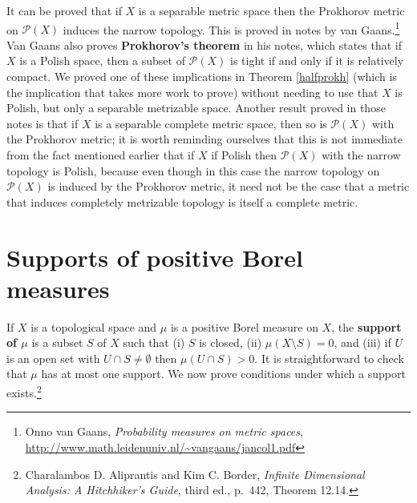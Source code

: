 \documentclass{article}
\theoremstyle{definition}
\begin{document}
It can be proved that if $X$ is a separable metric space then the Prokhorov metric on $\mathscr{P}(X)$ induces the 
narrow topology. This is proved in notes by  van Gaans.\footnote{Onno van Gaans, {\em Probability measures on metric spaces},
\url{http://www.math.leidenuniv.nl/~vangaans/jancol1.pdf}} Van Gaans also proves \textbf{Prokhorov's theorem} in his notes,
which states that if $X$ is a Polish space, then a subset of $\mathscr{P}(X)$ is tight if and only if it is relatively compact. We proved
one of these implications in Theorem \ref{halfprokh} (which is the implication that takes more work to prove) without needing to use that $X$ is Polish, but only a separable metrizable space.
Another result proved in those notes is that if $X$  is a separable complete metric space, then so is $\mathscr{P}(X)$ with the Prokhorov metric; it is worth
reminding ourselves that this is not immediate from the fact mentioned earlier that if $X$ if Polish then $\mathscr{P}(X)$ with the narrow topology is Polish,
because even though in this case the narrow topology on $\mathscr{P}(X)$ is induced by the Prokhorov metric, it need not be the case that 
a metric that induces completely metrizable topology is itself a complete metric.

\section{Supports of positive Borel measures}
If $X$ is a topological space
and $\mu$ is a positive Borel measure on $X$, the
\textbf{support of $\mu$} is a subset $S$ of $X$ such that (i) $S$ is closed, (ii)
$\mu(X \setminus S)=0$, and (iii) if $U$ is an open set
with $U \cap S \neq \emptyset$ then $\mu(U \cap S)>0$. 
It is straightforward to check that $\mu$ has at most one support.
We now prove conditions under which a support exists.\footnote{Charalambos D. Aliprantis and Kim C. Border,
{\em Infinite Dimensional Analysis: A Hitchhiker's Guide}, third ed., p.~442, Theorem 12.14.}
\end{document}
